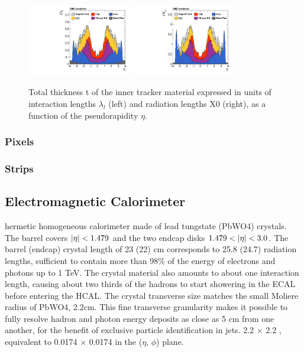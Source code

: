 \begin{figure}[htbp]
\centering
     \includegraphics[width=0.4\textwidth]{cms_and_lhc/plots/cms_tracker_thickness_radiationL.pdf}
     \includegraphics[width=0.4\textwidth]{cms_and_lhc/plots/cms_tracker_thickness_interactionL.pdf}
     \caption{
Total thickness t of the inner tracker material expressed in units of interaction lengths $\lambda_{l}$ (left) and radiation lengths X0 (right), as a function of the pseudorapidity $\eta$.
     }
     \label{fig:cms_tracker_thickness}
\end{figure}


\subsubsection{Pixels}
\subsubsection{Strips}
\subsection{Electromagnetic Calorimeter}

hermetic homogeneous calorimeter made of lead tungstate (PbWO4) crystals. The barrel covers $\lvert\eta\rvert < 1.479$ and the two endcap disks $1.479 < \lvert\eta\rvert < 3.0$.
The barrel (endcap) crystal length of 23 (22) cm corresponds to 25.8 (24.7) radiation lengths, sufficient to contain more than 98\% of the energy of electrons and photons up to 1 TeV.
The crystal material also amounts to about one interaction length, causing about two thirds of the hadrons to start showering in the ECAL before entering the HCAL.
The crystal transverse size matches the small Moliere radius of PbWO4, 2.2cm. This fine transverse granularity makes it possible to fully resolve hadron and photon energy deposits as close as 5 cm from one another, for the benefit of exclusive particle identification in jets.
2.2 × 2.2 \cmsq, equivalent to 0.0174 × 0.0174 in the ($\eta$, $\phi$) plane.

